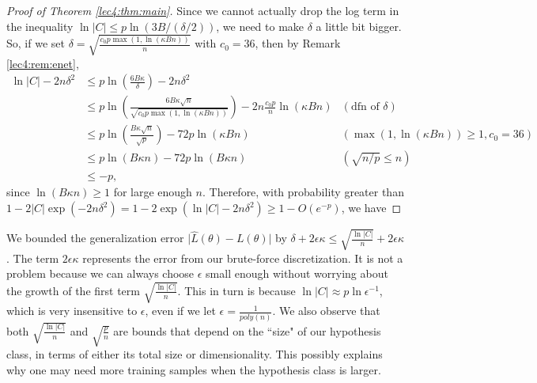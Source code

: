 \begin{proof}[Proof of Theorem \ref{lec4:thm:main}]
Since we cannot actually drop the log term in the inequality $\ln{|C|} \leq p \ln{ (3B / (\delta / 2)) }$, we need to make $\delta$ a little bit bigger. So, if we set $\delta = \sqrt{\frac{c_0 p \max(1, \ln{(\kappa Bn)})}{n}}$ with $c_0 = 36$, then by Remark \ref{lec4:rem:enet},
\begin{align}
\ln{\vert C \vert} - 2n\delta^2 &\leq p \ln\left(\frac{6B \kappa}{\delta}\right) - 2n\delta^2 \\
&\leq p \ln\left(\frac{6B\kappa \sqrt{n}}{ \sqrt{c_0 p \max(1, \ln{(\kappa Bn)})} }\right) - 2n \frac{c_0p}{n} \ln(\kappa Bn) &(\text{dfn of } \delta)  \\
&\leq p\ln\left(\frac{B\kappa \sqrt{n}}{\sqrt{p}}\right) - 72 p \ln(\kappa Bn) &(\max(1, \ln{(\kappa Bn)}) \geq 1, c_0 = 36) \\
&\leq p \ln(B\kappa n) - 72 p \ln(B\kappa n) &(\sqrt{n/p} \leq n) \\
&\leq -p,
\end{align}
since $\ln (B\kappa n) \geq 1$ for large enough $n$. Therefore, with probability greater than $1 - 2|C| \exp(-2n\delta^2) = 1 - 2 \exp(\ln{|C|} - 2n\delta^2) \geq 1 - O(e^{-p})$, we have
\end{proof}

\begin{remark}
We bounded the generalization error $\vert \hat L(\theta) - L(\theta) \vert$ by $\delta + 2\epsilon \kappa \leq \sqrt{\frac{\ln{\vert C \vert}}{n}} + 2\epsilon \kappa$. The term $2\epsilon \kappa$ represents the error from our brute-force discretization. It is not a problem because we can always choose $\epsilon$ small enough without worrying about the growth of the first term $\sqrt{\frac{\ln{\vert C \vert}}{n}}$. This in turn is because $\ln{\vert C \vert} \approx p\ln{\epsilon^{-1}}$, which is very insensitive to $\epsilon$, even if we let $\epsilon = \frac{1}{poly(n)}$. We also observe that both $\sqrt{\frac{\ln{\vert C \vert}}{n}}$ and $\sqrt{\frac{p}{n}}$ are bounds that depend on the ``size" of our hypothesis class, in terms of either its total size or dimensionality. This possibly explains why one may need more training samples when the hypothesis class is larger.
\end{remark}
